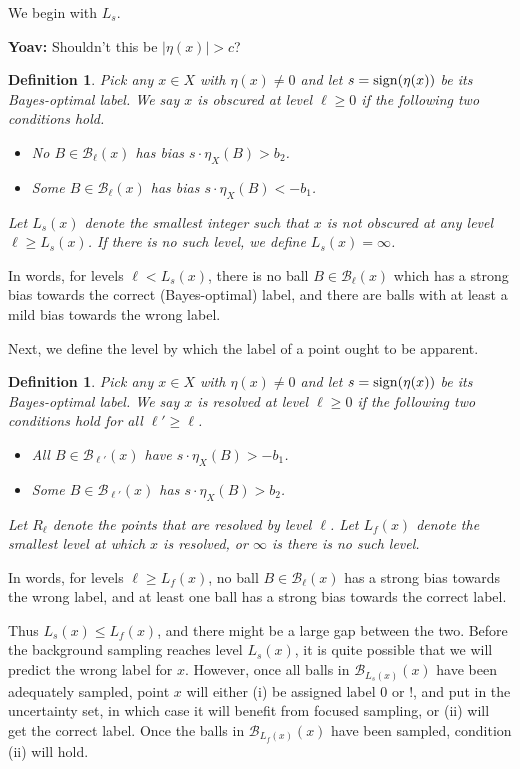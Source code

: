 \documentclass{article}
\def\B{{\mathcal B}}
\def\sign{{\rm sign}}
\newtheorem{defn}[thm]{Definition}
\newcommand{\yoav}[1]{{\color{blue} {\bf Yoav:} #1}}
\begin{document}
We begin with $L_s$.

\yoav{Shouldn't this be $|\eta(x)| > c$?} 
\begin{defn}
Pick any $x \in X$ with $\eta(x) \neq 0$ and let $s = \sign(\eta(x))$ be its Bayes-optimal label. We say $x$ is \emph{obscured} at level $\ell \geq 0$ if the following two conditions hold.
\begin{itemize}
\item No $B \in \B_\ell(x)$ has bias $s \cdot \eta_X(B) > b_2$.
\item Some $B \in \B_\ell(x)$ has bias $s \cdot \eta_X(B) < -b_1$.
\end{itemize}
Let $L_s(x)$ denote the smallest integer such that $x$ is not obscured at any level $\ell \geq L_s(x)$. If there is no such level, we define $L_s(x) = \infty$.
\label{defn:Ls}
\end{defn}
In words, for levels $\ell < L_s(x)$, there is no ball $B \in \B_\ell(x)$ which has a strong bias towards the correct (Bayes-optimal) label, and there are balls with at least a mild bias towards the wrong label.

Next, we define the level by which the label of a point ought to be apparent.
\begin{defn}
Pick any $x \in X$ with $\eta(x) \neq 0$ and let $s = \sign(\eta(x))$ be its Bayes-optimal label. We say $x$ is \emph{resolved} at level $\ell \geq 0$ if the following two conditions hold for all $\ell' \geq \ell$.
\begin{itemize}
\item All $B \in \B_{\ell'}(x)$ have $s \cdot \eta_X(B) > -b_1$.
\item Some $B \in \B_{\ell'}(x)$ has $s \cdot \eta_X(B) > b_2$.
\end{itemize}
Let $R_\ell$ denote the points that are resolved by level $\ell$. Let $L_f(x)$ denote the smallest level at which $x$ is resolved, or $\infty$ is there is no such level.
\label{defn:Lf}
\end{defn}
In words, for levels $\ell \geq L_f(x)$, no ball $B \in \B_\ell(x)$ has a strong bias towards the wrong label, and at least one ball has a strong bias towards the correct label.


Thus $L_s(x) \leq L_f(x)$, and there might be a large gap between the two. Before the background sampling reaches level $L_s(x)$, it is quite possible that we will predict the wrong label for $x$. However, once all balls in $\B_{L_s(x)}(x)$ have been adequately sampled, point $x$ will either (i) be assigned label $0$ or $!$, and put in the uncertainty set, in which case it will benefit from focused sampling, or (ii) will get the correct label. Once the balls in $\B_{L_f(x)}(x)$ have been sampled, condition (ii) will hold.
\end{document}
